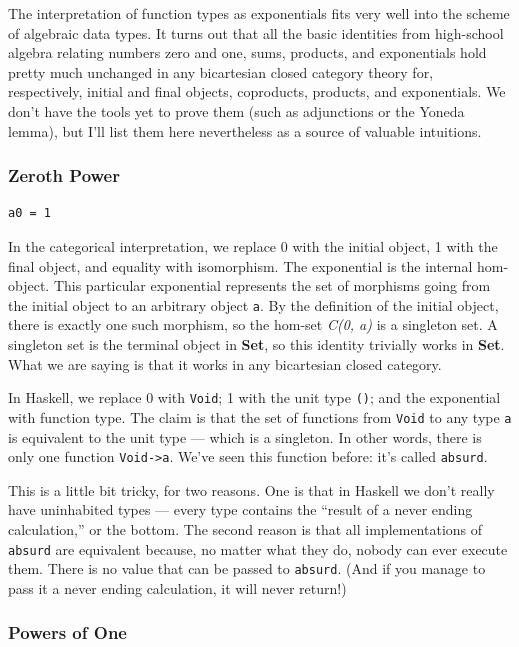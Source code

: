 The interpretation of function types as exponentials fits very well into
the scheme of algebraic data types. It turns out that all the basic
identities from high-school algebra relating numbers zero and one, sums,
products, and exponentials hold pretty much unchanged in any bicartesian
closed category theory for, respectively, initial and final objects,
coproducts, products, and exponentials. We don't have the tools yet to
prove them (such as adjunctions or the Yoneda lemma), but I'll list them
here nevertheless as a source of valuable intuitions.

\subsubsection{Zeroth Power}\label{zeroth-power}

\begin{verbatim}
a0 = 1
\end{verbatim}

In the categorical interpretation, we replace 0 with the initial object,
1 with the final object, and equality with isomorphism. The exponential
is the internal hom-object. This particular exponential represents the
set of morphisms going from the initial object to an arbitrary object
\texttt{a}. By the definition of the initial object, there is exactly
one such morphism, so the hom-set \emph{C(0, a)} is a singleton set. A
singleton set is the terminal object in \textbf{Set}, so this identity
trivially works in \textbf{Set}. What we are saying is that it works in
any bicartesian closed category.

In Haskell, we replace 0 with \texttt{Void}; 1 with the unit type
\texttt{()}; and the exponential with function type. The claim is that
the set of functions from \texttt{Void} to any type \texttt{a} is
equivalent to the unit type --- which is a singleton. In other words,
there is only one function \texttt{Void-\textgreater{}a}. We've seen
this function before: it's called \texttt{absurd}.

This is a little bit tricky, for two reasons. One is that in Haskell we
don't really have uninhabited types --- every type contains the ``result
of a never ending calculation,'' or the bottom. The second reason is
that all implementations of \texttt{absurd} are equivalent because, no
matter what they do, nobody can ever execute them. There is no value
that can be passed to \texttt{absurd}. (And if you manage to pass it a
never ending calculation, it will never return!)

\subsubsection{Powers of One}\label{powers-of-one}

